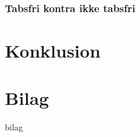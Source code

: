 \documentclass[12pt]{report}
\begin{document}
	\subsection{Tabsfri kontra ikke tabsfri}
	

\chapter{Konklusion}






\chapter*{Bilag}
 {bilag}
\end{document}
